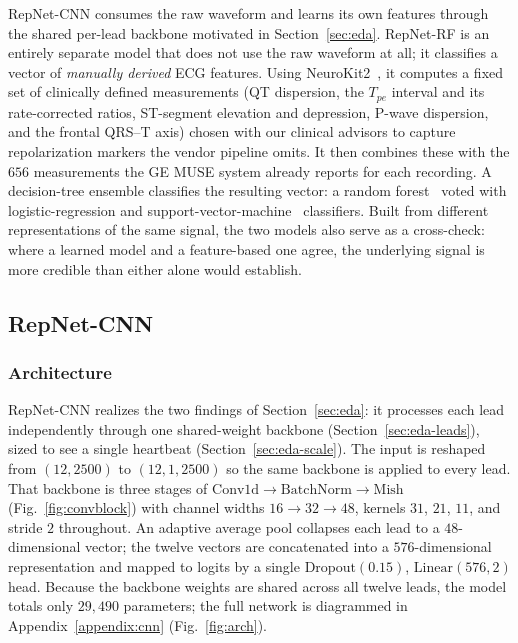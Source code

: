 \documentclass[sigconf,nonacm]{acmart}
\begin{document}
RepNet-CNN consumes the raw waveform and learns its own features through the
shared per-lead backbone motivated in Section~\ref{sec:eda}. RepNet-RF is an entirely separate model that does not
use the raw waveform at all; it classifies a vector of \emph{manually
derived} ECG features. Using NeuroKit2~\cite{makowski_neurokit2_2021}, it computes a fixed set of clinically defined measurements
(QT dispersion, the $T_{pe}$ interval and its rate-corrected ratios,
ST-segment elevation and depression, P-wave dispersion, and the frontal
QRS--T axis) chosen with our clinical advisors to capture repolarization
markers the vendor pipeline omits. It then combines these with the $656$
measurements the GE MUSE system already reports for each recording. A
decision-tree ensemble classifies the resulting vector: a random forest~\cite{breiman_random_2001} voted
with logistic-regression and support-vector-machine~\cite{cortes_support-vector_1995} classifiers. Built from different representations of
the same signal, the two models also serve as a cross-check: where a learned
model and a feature-based one agree, the underlying signal is more credible
than either alone would establish.

\subsection{RepNet-CNN}

\subsubsection{Architecture}
\label{sec:cnn-arch}

RepNet-CNN realizes the two findings of Section~\ref{sec:eda}: it processes
each lead independently through one shared-weight backbone
(Section~\ref{sec:eda-leads}), sized to see a single heartbeat
(Section~\ref{sec:eda-scale}). The input is reshaped from $(12,2500)$ to
$(12,1,2500)$ so the same backbone is applied to every lead. That backbone is
three stages of $\text{Conv1d}\to\text{BatchNorm}\to\text{Mish}$
(Fig.~\ref{fig:convblock}) with channel widths $16\to32\to48$, kernels $31$,
$21$, $11$, and stride $2$ throughout. An adaptive average pool collapses
each lead to a $48$-dimensional vector; the twelve vectors are concatenated
into a $576$-dimensional representation and mapped to logits by a single
$\mathrm{Dropout}(0.15)$, $\mathrm{Linear}(576,2)$ head. Because the backbone
weights are shared across all twelve leads, the model totals only
$29{,}490$ parameters; the full network is diagrammed in
Appendix~\ref{appendix:cnn} (Fig.~\ref{fig:arch}).
\end{document}
